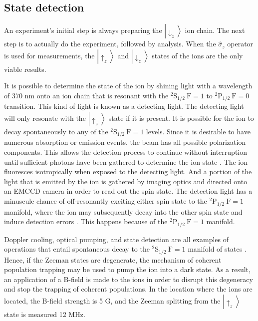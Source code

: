 \subsection{State detection}

An experiment's initial step is always preparing the $\left|\downarrow_z\right\rangle$ ion chain. The next step is to actually do the experiment, followed by analysis. When the $\hat{\sigma}_z$ operator is used for measurements, the $\left|\uparrow_z\right\rangle$ and $\left|\downarrow_z\right\rangle$ states of the ions are the only viable results.

It is possible to determine the state of the ion by shining light with a wavelength of 370 nm onto an ion chain that is resonant with the ${ }^2 \mathrm{S}_{1 / 2} \mathrm{~F}=1$ to ${ }^2 \mathrm{P}_{1 / 2} \mathrm{~F}=0$ transition. This kind of light is known as a detecting light. The detecting light will only resonate with the $\left|\uparrow_z\right\rangle$ state if it is present. It is possible for the ion to decay spontaneously to any of the ${ }^2 \mathrm{S}_{1 / 2} \mathrm{~F}=1$ levels. Since it is desirable to have numerous absorption or emission events, the beam has all possible polarization components. This allows the detection process to continue without interruption until sufficient photons have been gathered to determine the ion state \cite{RN221,RN298,RN104,RN222}. The ion fluoresces isotropically when exposed to the detecting light. And a portion of the light that is emitted by the ion is gathered by imaging optics and directed onto an EMCCD camera in order to read out the spin state. The detection light has a minuscule chance of off-resonantly exciting either spin state to the ${ }^2 \mathrm{P}_{1 / 2} \mathrm{~F}=1$ manifold, where the ion may subsequently decay into the other spin state and induce detection errors \cite{RN235}. This happens because of the ${ }^2 \mathrm{P}_{1 / 2} \mathrm{~F}=1$ manifold.

Doppler cooling, optical pumping, and state detection are all examples of operations that entail spontaneous decay to the ${ }^2 \mathrm{S}_{1 / 2} \mathrm{~F}=1$ manifold of states \cite{RN215}. Hence, if the Zeeman states are degenerate, the mechanism of coherent population trapping may be used to pump the ion into a dark state. As a result, an application of a B-field is made to the ions in order to disrupt this degeneracy and stop the trapping of coherent populations. In the location where the ions are located, the B-field strength is 5 G, and the Zeeman splitting from the $\left|\uparrow_z\right\rangle$ state is measured 12 MHz.

